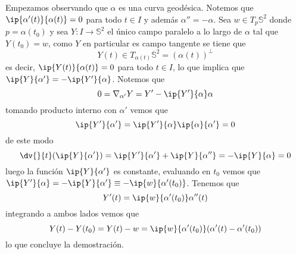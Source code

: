 \documentclass{article}
\begin{document}
\begin{dem}
    Empezamos observando que $\alpha$ es una curva geodésica. Notemos que 
    $\ip{\alpha'(t)}{\alpha(t)}=0$ para todo $t\in I$ y además $\alpha''=-\alpha$. Sea 
    $w\in T_{p}\mathbb{S}^{2}$ donde $p=\alpha(t_{0})$ y sea $Y:I\to\mathbb{S}^{2}$ el único campo 
    paralelo a lo largo de $\alpha$ tal que $Y(t_{0})=w$, como $Y$ en particular es campo tangente 
    se tiene que
    \begin{equation*}
        Y(t)\in T_{\alpha(t)}\mathbb{S}^{2}=(\alpha(t))^{\perp}
    \end{equation*}
    es decir, $\ip{Y(t)}{\alpha(t)}=0$ para todo $t\in I$, lo que implica que $\ip{Y}{\alpha'}
    =-\ip{Y'}{\alpha}$. Notemos que
    \begin{equation*}
        0=\nabla_{\alpha'}Y=Y'-\ip{Y'}{\alpha}\alpha
    \end{equation*}
    tomando producto interno con $\alpha'$ vemos que
    \begin{equation*}
        \ip{Y'}{\alpha'}=\ip{Y'}{\alpha}\ip{\alpha}{\alpha'}=0
    \end{equation*}
    de este modo
    \begin{equation*}
        \dv{}{t}(\ip{Y}{\alpha'})=\ip{Y'}{\alpha'}+\ip{Y}{\alpha''}=-\ip{Y}{\alpha}=0
    \end{equation*}
    luego la función $\ip{Y}{\alpha'}$ es constante, evaluando en $t_{0}$ vemos que 
    $\ip{Y'}{\alpha}=-\ip{Y}{\alpha'}\equiv-\ip{w}{\alpha'(t_{0})}$. Tenemos que
    \begin{equation*}
        Y'(t)=\ip{w}{\alpha'(t_{0})}\alpha''(t)
    \end{equation*}
    integrando a ambos lados vemos que
    \begin{equation*}
        Y(t)-Y(t_{0})=Y(t)-w=\ip{w}{\alpha'(t_{0})}(\alpha'(t)-\alpha'(t_{0}))
    \end{equation*}
    lo que concluye la demostración.
\end{dem}
\end{document}
